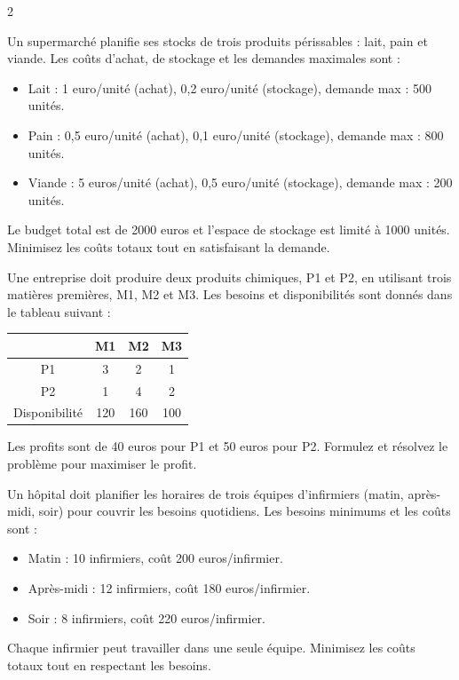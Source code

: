 \begin{multicols}{2}
\begin{exercice}
	Un supermarché planifie ses stocks de trois produits périssables : lait, pain et viande. Les coûts d'achat, de stockage et les demandes maximales sont :
	\begin{itemize}
		\item Lait : 1 euro/unité (achat), 0,2 euro/unité (stockage), demande max : 500 unités.
		\item Pain : 0,5 euro/unité (achat), 0,1 euro/unité (stockage), demande max : 800 unités.
		\item Viande : 5 euros/unité (achat), 0,5 euro/unité (stockage), demande max : 200 unités.
	\end{itemize}
	Le budget total est de 2000 euros et l'espace de stockage est limité à 1000 unités. Minimisez les coûts totaux tout en satisfaisant la demande.
\end{exercice}

\begin{exercice}
	Une entreprise doit produire deux produits chimiques, P1 et P2, en utilisant trois matières premières, M1, M2 et M3. Les besoins et disponibilités sont donnés dans le tableau suivant :
	\begin{center}
		\begin{tabular}{c|ccc}
			& M1 & M2 & M3 \\
			\hline
			P1 & 3 & 2 & 1 \\
			P2 & 1 & 4 & 2 \\
			Disponibilité & 120 & 160 & 100 \\
		\end{tabular}
	\end{center}
	Les profits sont de 40 euros pour P1 et 50 euros pour P2. Formulez et résolvez le problème pour maximiser le profit.
\end{exercice}

\begin{exercice}
	Un hôpital doit planifier les horaires de trois équipes d'infirmiers (matin, après-midi, soir) pour couvrir les besoins quotidiens. Les besoins minimums et les coûts sont :
	\begin{itemize}
		\item Matin : 10 infirmiers, coût 200 euros/infirmier.
		\item Après-midi : 12 infirmiers, coût 180 euros/infirmier.
		\item Soir : 8 infirmiers, coût 220 euros/infirmier.
	\end{itemize}
	Chaque infirmier peut travailler dans une seule équipe. Minimisez les coûts totaux tout en respectant les besoins.
\end{exercice}


\end{multicols}
